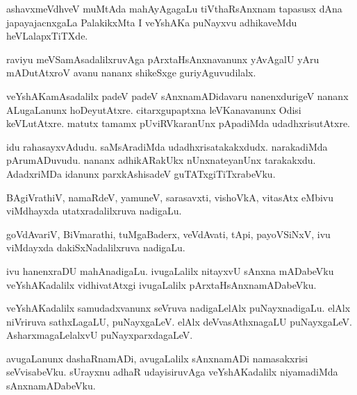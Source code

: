 \documentclass{article}
\begin{document}
\begin{mn}%
ashavxmeVdhveV muMtAda mahAyAgagaLu tiVthaRsAnxnam tapasusx dAna japayajacnxgaLa 
PalakikxMta I veYshAKa puNayxvu adhikaveMdu heVLalapxTiTXde.
\end{mn}

\begin{mn}%
raviyu meVSamAsadalilxruvAga pArxtaHsAnxnavanunx yAvAgalU yAru mADutAtxroV avanu nananx 
shikeSxge guriyAguvudilalx.
\end{mn}

\begin{mn}%
veYshAKamAsadalilx padeV padeV sAnxnamADidavaru nanenxdurigeV nananx ALugaLanunx 
hoDeyutAtxre. citarxgupaptxna leVKanavanunx Odisi keVLutAtxre. matutx tamamx 
pUviRVkaranUnx pApadiMda udadhxrisutAtxre.
\end{mn}

\begin{mn}%
idu rahasayxvAdudu. saMsAradiMda udadhxrisatakakxdudx. narakadiMda pArumADuvudu. nananx 
adhikARakUkx nUnxnateyanUnx tarakakxdu. AdadxriMDa idanunx parxkAshisadeV 
guTATxgiTiTxrabeVku.
\end{mn}

\begin{mn}%
BAgiVrathiV, namaRdeV, yamuneV, sarasavxti, vishoVkA, vitasAtx eMbivu viMdhayxda 
utatxradalilxruva nadigaLu.
\end{mn}

\begin{mn}%
goVdAvariV, BiVmarathi, tuMgaBaderx, veVdAvati, tApi, payoVSiNxV, ivu viMdayxda 
dakiSxNadalilxruva nadigaLu.
\end{mn}

\begin{mn}%
ivu hanenxraDU mahAnadigaLu. ivugaLalilx nitayxvU sAnxna mADabeVku veYshAKadalilx 
vidhivatAtxgi ivugaLalilx pArxtaHsAnxnamADabeVku.
\end{mn}

\begin{mn}%
veYshAKadalilx samudadxvanunx seVruva nadigaLelAlx puNayxnadigaLu. elAlx niVriruva 
sathxLagaLU, puNayxgaLeV. elAlx deVvasAthxnagaLU puNayxgaLeV. AsharxmagaLelalxvU 
puNayxparxdagaLeV.
\end{mn}

\begin{mn}%
avugaLanunx dashaRnamADi, avugaLalilx sAnxnamADi namasakxrisi seVvisabeVku. sUrayxnu adhaR 
udayisiruvAga veYshAKadalilx niyamadiMda sAnxnamADabeVku.
\end{mn}
\end{document}
